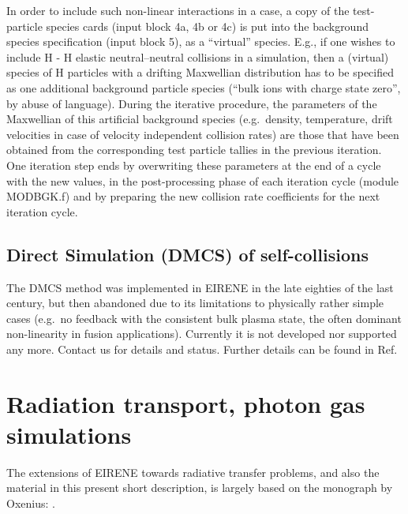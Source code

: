 In order to include such non-linear interactions in a case, a copy of the
test-particle species cards (input block 4a, 4b or 4c) is put into the
background species specification (input block 5), as a ``virtual'' species.
E.g., if one wishes to include H - H elastic neutral--neutral collisions in a
simulation, then a (virtual) species of H particles with a drifting Maxwellian
distribution has to be specified as one additional background particle species
(``bulk ions with charge state zero'', by abuse of language).
During the iterative procedure, the parameters of the Maxwellian of this
artificial background species (e.g.\ density, temperature, drift velocities in
case of velocity independent collision rates) are those that have been obtained
from the corresponding test particle tallies in the previous iteration.
One iteration step ends by overwriting these parameters at the end of a cycle
with the new values, in the post-processing phase of each iteration cycle
(module MODBGK.f) and by preparing the new collision rate coefficients for the
next iteration cycle.

\subsection{Direct Simulation (\acs{DMCS}) of self-collisions}

The \ac{DMCS} method was implemented in EIRENE in the late eighties of the last
century, but then abandoned due to its limitations to physically rather simple
cases (e.g.\ no feedback with the consistent bulk plasma state, the often
dominant non-linearity in fusion applications).
Currently it is not developed nor supported  any more.
Contact us for details and status.
Further details can be found in Ref.\ \cite{kn:Behringer} 

\section{Radiation transport, photon gas simulations} 

The extensions of EIRENE towards radiative transfer problems, and also the
material in this present short description, is largely based on the monograph
by Oxenius: \cite{kn:Oxenius}.

